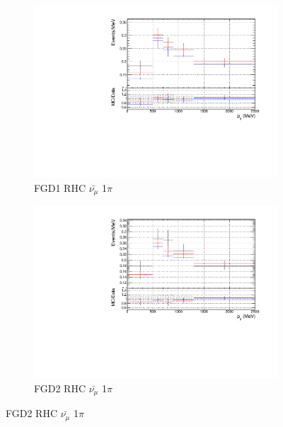 \begin{figure}[!htbp]
\begin{subfigure}{0.49\textwidth}
  \centering
  \includegraphics[width=\textwidth]{figs/priorpred1D_p_FGD1_anti-numuCC_1pi}
  \caption{FGD1 RHC $\bar{\nu_{\mu}}$ 1$\pi$}
\end{subfigure}
\centering
\begin{subfigure}{0.49\textwidth}
  \centering
  \includegraphics[width=\textwidth]{figs/priorpred1D_p_FGD2_anti-numuCC_1pi}
  \caption{FGD2 RHC $\bar{\nu_{\mu}}$ 1$\pi$}
\end{subfigure}


\end{figure}
